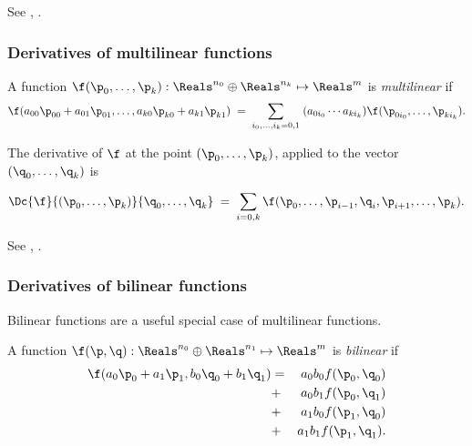 See \cite[Theorem~2-2]{Spivak:1965:CalculusOnManifolds}, .


\subsubsection{Derivatives of multilinear functions}
\label{sec:multilinear}

A function $\f(\p_0,\ldots,\p_k):\Reals^{n_0} \oplus \Reals^{n_k} \mapsto \Reals^m$
is {\it multilinear} if
\begin{equation}
\f(a_{00} \p_{00} + a_{01} \p_{01}, \ldots, a_{k0} \p_{k0} + a_{k1} \p_{k1})
\; = \; \sum_{i_0,\ldots,i_k = 0,1} \;(a_{0i_0} \cdots a_{ki_k}) \f(\p_{0i_0}, \ldots, \p_{ki_k}).
\end{equation}

The derivative of $\f$
at the point $(\p_0,\ldots,\p_k)$, applied to the vector $(\q_0,\ldots,\q_k)$ is

\begin{equation}
\Dc{\f}{(\p_0,\ldots,\p_k)}{\q_0,\ldots,\q_k}
\; = \; \sum_{i=0,k} \f(\p_0,\ldots,\p_{i-1},\q_i,\p_{i+1},\ldots,\p_k).
\end{equation}

See \cite[ex.~2-14]{Spivak:1965:CalculusOnManifolds}, .



\subsubsection{Derivatives of bilinear functions}
\label{sec:bilinear}

Bilinear functions are a useful special case of multilinear functions.

A function $\f(\p,\q):\Reals^{n_0} \oplus \Reals^{n_1} \mapsto \Reals^m$
is {\it bilinear} if
\begin{eqnarray}
\f(a_0 \p_0 + a_1 \p_1, b_0 \q_0 + b_1 \q_1) & = & a_0 b_0 f(\p_0,\q_0)  \\
                                             & + & a_0 b_1 f(\p_0,\q_1) \nonumber \\
                                             & + & a_1 b_0 f(\p_1,\q_0) \nonumber \\
                                             & + & a_1 b_1 f(\p_1,\q_1).\nonumber
\end{eqnarray}

